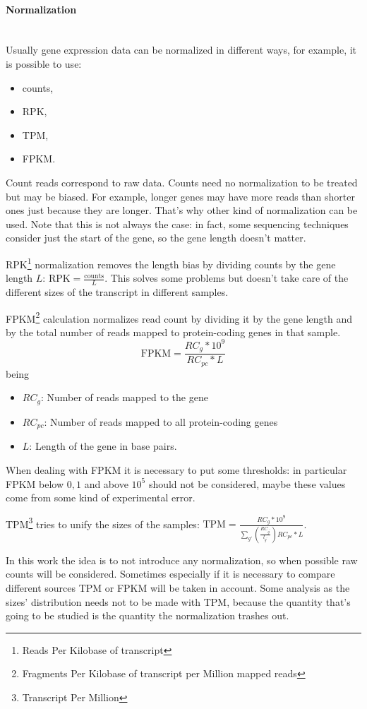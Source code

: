\paragraph{Normalization}\mbox{}\\
Usually gene expression data can be normalized in different ways, for example, it is possible to use:
\begin{itemize}
	\item counts,
	\item RPK,
	\item TPM,
	\item FPKM.
\end{itemize}
Count reads correspond to raw data. Counts need no normalization to be treated but may be biased. For example, longer genes may have more reads than shorter ones just because they are longer. That's why other kind of normalization can be used. Note that this is not always the case: in fact, some sequencing techniques consider just the start of the gene, so the gene length doesn't matter.   

RPK\footnote{Reads Per Kilobase of transcript} normalization removes the length bias by dividing counts by the gene length $L$: \(\text{RPK}=\frac{\text{counts}}{L}\). This solves some problems but doesn't take care of the different sizes of the transcript in different samples.

FPKM\footnote{Fragments Per Kilobase of transcript per Million mapped reads} calculation normalizes read count by dividing it by the gene length and by the total number of reads mapped to protein-coding genes in that sample.
\[
\text{FPKM} = \frac{RC_g*10^9}{RC_{pc}*L}
\]
being
\begin{itemize}
	\item $RC_g$: Number of reads mapped to the gene
	\item $RC_{pc}$: Number of reads mapped to all protein-coding genes
	\item $L$: Length of the gene in base pairs.
\end{itemize}
When dealing with FPKM it is necessary to put some thresholds: in particular FPKM below $0,1$ and above $10^5$ should not be considered, maybe these values come from some kind of experimental error.

TPM\footnote{Transcript Per Million} tries to unify the sizes of the samples: $\text{TPM} = \frac{RC_g*10^9}{\sum_{g\prime} \left(\frac{RC_{g^\prime}}{l_{g^\prime}}\right) RC_{pc}*L}$.

In this work the idea is to not introduce any normalization, so when possible raw counts will be considered. Sometimes especially if it is necessary to compare different sources TPM or FPKM will be taken in account. Some analysis as the sizes' distribution needs not to be made with TPM, because the quantity that's going to be studied is the quantity the normalization trashes out.

